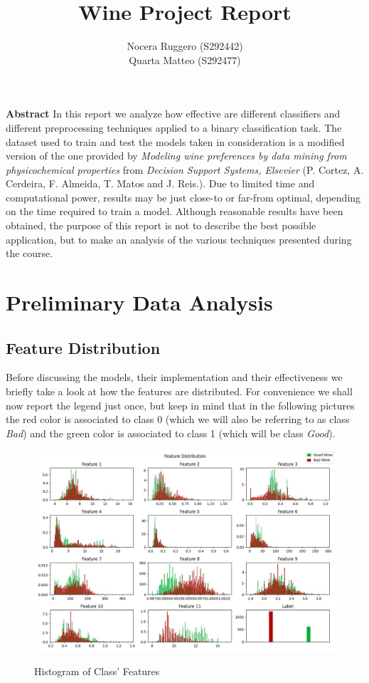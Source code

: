\documentclass[hidelinks, 12pt, twocolumn]{article}
\title{Wine Project Report}
\author{Nocera Ruggero (S292442) \\ Quarta Matteo (S292477)}
\date{}
\begin{document}
\maketitle
\begin{strip}
    {\bf Abstract}
    In this report we analyze how effective are different classifiers and different preprocessing techniques applied to a binary classification task.
    The dataset used to train and test the models taken in consideration is a modified version of
    the one provided by {\it Modeling wine preferences by data mining from physicochemical properties}
    from {\it Decision Support Systems, Elsevier} (P. Cortez, A. Cerdeira, F. Almeida, T. Matos and J. Reis.).
    Due to limited time and computational power, results may be just close-to or far-from optimal, depending on the time required to train a model.
    Although reasonable results have been obtained, the purpose of this report is not to describe the best possible application,
    but to make an analysis of the various techniques presented during the course.

\end{strip}
\tableofcontents


\section{Preliminary Data Analysis}
\subsection{Feature Distribution}

Before discussing the models, their implementation and their effectiveness we briefly take a look at how the features are distributed.
For convenience we shall now report the legend just once, but keep in mind that in the following pictures the red color is associated to class 0 
(which we will also be referring to as class {\it Bad}) and the green color is associated to class 1 (which will be class {\it Good}).

\begin{figure}[H] 
    \caption{Histogram of Class' Features}
    \label{fig:disthist}
    {\includegraphics[width=\linewidth]{dist.jpg}}
\end{figure}
\end{document}
